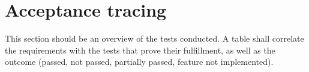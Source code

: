 \section{Acceptance tracing}

This section should be an overview of the tests conducted.
A table shall correlate the requirements with the tests that prove their fulfillment, as well as the outcome (passed, not passed, partially passed, feature not implemented).